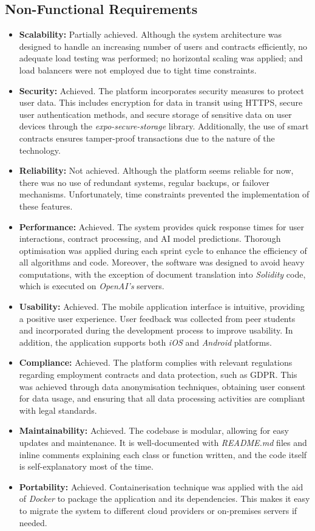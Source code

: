 \subsection{Non-Functional Requirements}

\begin{itemize}
    \item \textbf{Scalability:} Partially achieved. Although the system architecture was designed to handle an increasing number of users and contracts efficiently, no adequate load testing was performed; no horizontal scaling was applied; and load balancers were not employed due to tight time constraints.
    \item \textbf{Security:} Achieved. The platform incorporates security measures to protect user data. This includes encryption for data in transit using HTTPS, secure user authentication methods, and secure storage of sensitive data on user devices through the \textit{expo-secure-storage} library. Additionally, the use of smart contracts ensures tamper-proof transactions due to the nature of the technology.
    \item \textbf{Reliability:} Not achieved. Although the platform seems reliable for now, there was no use of redundant systems, regular backups, or failover mechanisms. Unfortunately, time constraints prevented the implementation of these features.
    \item \textbf{Performance:} Achieved. The system provides quick response times for user interactions, contract processing, and AI model predictions. Thorough optimisation was applied during each sprint cycle to enhance the efficiency of all algorithms and code. Moreover, the software was designed to avoid heavy computations, with the exception of document translation into \textit{Solidity} code, which is executed on \textit{OpenAI's} servers.
    \item \textbf{Usability:} Achieved. The mobile application interface is intuitive, providing a positive user experience. User feedback was collected from peer students and incorporated during the development process to improve usability. In addition, the application supports both \textit{iOS} and \textit{Android} platforms.
    \item \textbf{Compliance:} Achieved. The platform complies with relevant regulations regarding employment contracts and data protection, such as GDPR. This was achieved through data anonymisation techniques, obtaining user consent for data usage, and ensuring that all data processing activities are compliant with legal standards.
    \item \textbf{Maintainability:} Achieved. The codebase is modular, allowing for easy updates and maintenance. It is well-documented with \textit{README.md} files and inline comments explaining each class or function written, and the code itself is self-explanatory most of the time.
    \item \textbf{Portability:} Achieved. Containerisation technique was applied with the aid of \textit{Docker} to package the application and its dependencies. This makes it easy to migrate the system to different cloud providers or on-premises servers if needed.
\end{itemize}


